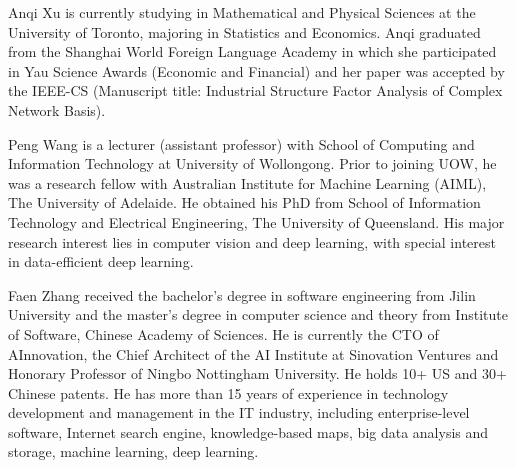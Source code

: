 \documentclass[10pt,journal,compsoc]{IEEEtran}
\begin{document}
\begin{IEEEbiography}{Anqi Xu} is currently studying in Mathematical and Physical Sciences at the University of Toronto, majoring in Statistics and Economics. Anqi graduated from the Shanghai World Foreign Language Academy in which she participated in Yau Science Awards (Economic and Financial) and her paper was accepted by the IEEE-CS (Manuscript title: Industrial Structure Factor Analysis of Complex Network Basis).
\end{IEEEbiography}

\begin{IEEEbiography}{Peng Wang} is a lecturer (assistant professor) with School of Computing and Information Technology at University of Wollongong. Prior to joining UOW, he was a research fellow with Australian Institute for Machine Learning (AIML), The University of Adelaide. He obtained his PhD from School of Information Technology and Electrical Engineering, The University of Queensland. His major research interest lies in computer vision and deep learning, with special interest in data-efficient deep learning.
\end{IEEEbiography}

\begin{IEEEbiography}{Faen Zhang} received the bachelor's degree in software engineering from Jilin University and the master's degree in computer science and theory from Institute of Software, Chinese Academy of Sciences. He is currently the CTO of AInnovation, the Chief Architect of the AI Institute at Sinovation Ventures and Honorary Professor of Ningbo Nottingham University. He holds 10+ US and 30+ Chinese patents. He has more than 15 years of experience in technology development and management in the IT industry, including enterprise-level software, Internet search engine, knowledge-based maps, big data analysis and storage, machine learning, deep learning. 

\end{IEEEbiography}
\end{document}
